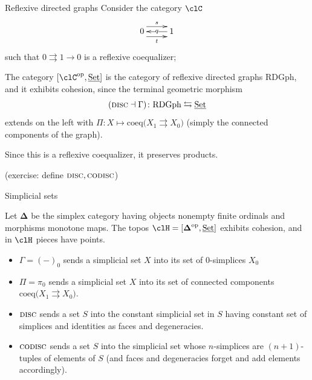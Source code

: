 \documentclass[presentation]{beamer}
\begin{document}
%
%
%
%
%
%
%
%
%
\begin{frame}{Reflexive directed graphs}
	Consider the category $\clC$
	\[
		\xymatrix{
			0 \ar@<6pt>[r]^s \ar@<-6pt>[r]_t & \ar[l]|q 1
		}
	\]
	such that $0 \rightrightarrows 1 \to 0$ is a reflexive coequalizer;%

	\onslide<+->
	The category $[\clC^\text{op},\Set]$ is the category of \alert{reflexive directed graphs} $\text{RDGph}$, and it exhibits cohesion, since the terminal geometric morphism
	\[
		(\textsc{disc}\dashv\Gamma)\colon \text{RDGph} \leftrightarrows \underline{\text{Set}}
	\]
	extends on the left with $\Pi\colon X \mapsto \text{coeq}\Big( X_1 \rightrightarrows X_0\Big)$ (simply the connected components of the graph).

  Since this is a reflexive coequalizer, it preserves products.
  
  (exercise: define $\textsc{disc}, \textsc{codisc}$)
\end{frame}
%
%
%
%
%
%
%
%
%
\begin{frame}{Simplicial sets}
\begin{prop}
Let $\boldsymbol\Delta$ be the \alert{simplex category} having objects nonempty finite ordinals and morphisms monotone maps. The topos $\clH=[\boldsymbol\Delta^\text{op}, \Set]$ exhibits cohesion, and in $\clH$ pieces have points.
\end{prop}
\begin{itemize}
\item<+-> $\Gamma = (-)_0$ sends a simplicial set $X$ into its set of 0-simplices $X_0$
\item<+-> $\Pi=\pi_0$ sends a simplicial set $X$ into its set of connected components $\text{coeq}\Big( X_1 \rightrightarrows X_0\Big)$.
\item<+-> $\textsc{disc}$ sends a set $S$ into the constant simplicial set in $S$ having constant set of simplices and identities as faces and degeneracies.
\item<+-> $\textsc{codisc}$ sends a set $S$ into the simplicial set whose $n$-simplices are $(n+1)$-tuples of elements of $S$ (and faces and degeneracies forget and add elements accordingly).
\end{itemize}
\end{frame}
\end{document}
